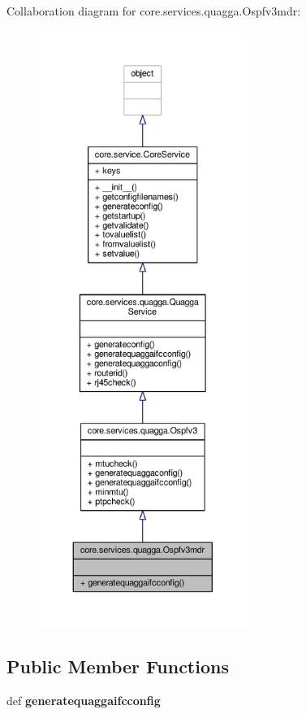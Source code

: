 Collaboration diagram for core.\+services.\+quagga.\+Ospfv3mdr\+:
\nopagebreak
\begin{figure}[H]
\begin{center}
\leavevmode
\includegraphics[height=550pt]{classcore_1_1services_1_1quagga_1_1_ospfv3mdr__coll__graph}
\end{center}
\end{figure}
\subsection*{Public Member Functions}
\begin{DoxyCompactItemize}
\item 
\hypertarget{classcore_1_1services_1_1quagga_1_1_ospfv3mdr_a4233a1dba40fd76bd0cf02079a1b2ae3}{def {\bfseries generatequaggaifcconfig}}\label{classcore_1_1services_1_1quagga_1_1_ospfv3mdr_a4233a1dba40fd76bd0cf02079a1b2ae3}

\end{DoxyCompactItemize}
